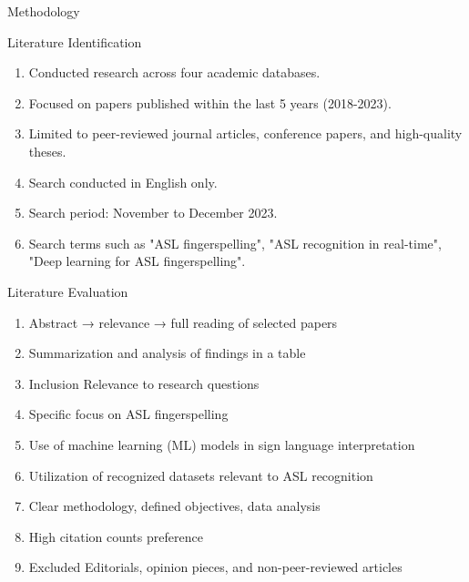 \documentclass{beamer} %
\begin{document}
\begin{frame}[t]
\begin{columns}[t]
\begin{column}{0.3\textwidth}
\begin{block}{Methodology}
\begin{minipage}{0.48\linewidth}
					Literature Identification
					\begin{enumerate}
						\item Conducted research across four academic databases.
						\item Focused on papers published within the last 5 years (2018-2023).
						\item Limited to peer-reviewed journal articles, conference papers, and high-quality theses.
						\item Search conducted in English only.
						\item Search period: November to December 2023.
						\item Search terms such as "ASL fingerspelling", "ASL recognition in real-time", "Deep learning for ASL fingerspelling".
					\end{enumerate}
				\end{minipage}
				\hfill %
				\begin{minipage}{0.48\linewidth}
					Literature Evaluation
					\begin{enumerate}
						\item Abstract → relevance → full reading of selected papers
						\item Summarization and analysis of findings in a table
						\item \alert {Inclusion} Relevance to research questions
						\item Specific focus on ASL fingerspelling
						\item Use of machine learning (ML) models in sign language interpretation
						\item Utilization of recognized datasets relevant to ASL recognition
						\item Clear methodology, defined objectives, data analysis
						\item High citation counts preference
						\item \alert {Excluded} Editorials, opinion pieces, and non-peer-reviewed articles
					\end{enumerate}
				\end{minipage}
			\end{block}



\end{column}
\end{columns}
\end{frame}
\end{document}
